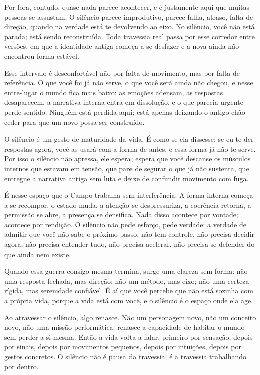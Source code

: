 \documentclass[12pt]{book}
\begin{document}
Por fora, contudo, quase nada parece acontecer, e é justamente aqui que muitas pessoas se assustam. O silêncio parece improdutivo, parece falha, atraso, falta de direção, quando na verdade está te devolvendo ao eixo. No silêncio, você não está parada; está sendo reconstruída. Toda travessia real passa por esse corredor entre versões, em que a identidade antiga começa a se desfazer e a nova ainda não encontrou forma estável.

Esse intervalo é desconfortável não por falta de movimento, mas por falta de referência. O que você foi já não serve, o que você será ainda não chegou, e nesse entre-lugar o mundo fica mais baixo: as emoções adensam, as respostas desaparecem, a narrativa interna entra em dissolução, e o que parecia urgente perde sentido. Ninguém está perdida aqui; está apenas deixando o antigo chão ceder para que um novo possa ser construído.

O silêncio é um gesto de maturidade da vida. É como se ela dissesse: se eu te der respostas agora, você as usará com a forma de antes, e essa forma já não te serve. Por isso o silêncio não apressa, ele espera; espera que você descanse os músculos internos que estavam em tensão, que pare de segurar o que já não sustenta, que entregue a narrativa antiga sem luta e deixe de confundir movimento com fuga.

É nesse espaço que o Campo trabalha sem interferência. A forma interna começa a se recompor, o estado muda, a atenção se despressuriza, a coerência retorna, a permissão se abre, a presença se densifica. Nada disso acontece por vontade; acontece por rendição. O silêncio não pede esforço, pede verdade: a verdade de admitir que você não sabe o próximo passo, não tem controle, não precisa decidir agora, não precisa entender tudo, não precisa acelerar, não precisa se defender do que ainda nem existe.

Quando essa guerra consigo mesma termina, surge uma clareza sem forma: não uma resposta fechada, mas direção; não um método, mas eixo; não uma certeza rígida, mas serenidade confiável. É aí que você percebe que não está sozinha com a própria vida, porque a vida está com você, e o silêncio é o espaço onde ela age.

Ao atravessar o silêncio, algo renasce. Não um personagem novo, não um conceito novo, não uma missão performática; renasce a capacidade de habitar o mundo sem perder a si mesma. Então a vida volta a falar, primeiro por sensação, depois por sinais, depois por movimentos pequenos, depois por intuições, depois por gestos concretos. O silêncio não é pausa da travessia; é a travessia trabalhando por dentro.
\end{document}
